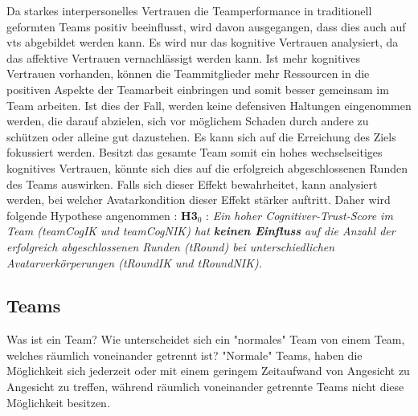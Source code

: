 \documentclass[a4paper,11pt]{article}%
\renewcommand{\\}{\vspace*{0.5\baselineskip} \newline}
\begin{document}
Da starkes interpersonelles Vertrauen die Teamperformance in traditionell geformten Teams positiv beeinflusst, wird davon ausgegangen, dass dies auch auf \ac{vts} abgebildet werden kann. Es wird nur das kognitive Vertrauen analysiert, da das affektive Vertrauen vernachlässigt werden kann. Ist mehr kognitives Vertrauen vorhanden, können die Teammitglieder mehr Ressourcen in die positiven Aspekte der Teamarbeit einbringen und somit besser gemeinsam im Team arbeiten. Ist dies der Fall, werden keine defensiven Haltungen eingenommen werden, die darauf abzielen, sich vor möglichem Schaden durch andere zu schützen oder alleine gut dazustehen. Es kann sich auf die Erreichung des Ziels fokussiert werden. Besitzt das gesamte Team somit ein hohes wechselseitiges kognitives Vertrauen, könnte sich dies auf die erfolgreich abgeschlossenen Runden des Teams auswirken. Falls sich dieser Effekt bewahrheitet, kann analysiert werden, bei welcher Avatarkondition dieser Effekt stärker auftritt. 
Daher wird folgende Hypothese angenommen :\\
\textbf{H3$_{0}$} : \textit{Ein hoher Cognitiver-Trust-Score im Team (\ac{teamCogIK} und \ac{teamCogNIK}) hat \textbf{keinen Einfluss} auf die Anzahl der erfolgreich abgeschlossenen Runden (\ac{tRound}) bei unterschiedlichen Avatarverkörperungen (\ac{tRoundIK} und \ac{tRoundNIK}).}



\newpage
	\subsection{Teams}		
	\label{Teamwork}
Was ist ein Team? Wie unterscheidet sich ein "normales" Team von einem Team, welches räumlich voneinander getrennt ist? "Normale" Teams, haben die Möglichkeit sich jederzeit oder mit einem geringem Zeitaufwand von Angesicht zu Angesicht zu treffen, während räumlich voneinander getrennte Teams nicht diese Möglichkeit besitzen.
\end{document}
